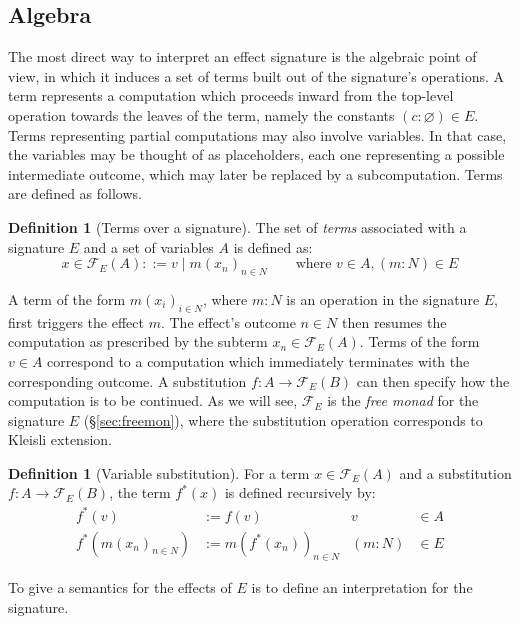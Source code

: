 \documentclass[draft,11pt]{report}
\theoremstyle{definition}
\newtheorem{definition}[theorem]{Definition}
\begin{document}

\subsection{Algebra} %

The most direct way to interpret an effect signature
is the algebraic point of view,
in which it induces a set of terms
built out of the signature's operations.
A term represents a computation which proceeds inward
from the top-level operation
towards the leaves of the term,
namely the constants $(c : \varnothing) \in E$.
Terms representing partial computations may also involve variables.
In that case,
the variables may be thought of as placeholders,
each one representing a possible intermediate outcome,
which may later be replaced by a subcomputation.
Terms are defined as follows.

\begin{definition}[Terms over a signature]
The set of \emph{terms} associated with
a signature $E$ and a set of variables $A$
is defined as:
\[
  x \in \mathcal{F}_E(A) ::= v \mid m(x_n)_{n \in N}
  \qquad
  \text{where } v \in A, (m : N) \in E
\]
\end{definition}

A term of the form $m(x_i)_{i \in N}$,
where $m : N$ is an operation in the signature $E$,
first triggers the effect $m$.
The effect's outcome $n \in N$ then resumes the computation
as prescribed by the subterm $x_n \in \mathcal{F}_E(A)$.
Terms of the form $v \in A$ correspond to a computation
which immediately terminates with the corresponding outcome.
A substitution $f : A \rightarrow \mathcal{F}_E(B)$
can then specify how the computation is to be continued.
As we will see,
$\mathcal{F}_E$ is the \emph{free monad}
for the signature $E$ (\S\ref{sec:freemon}),
where the substitution operation
corresponds to Kleisli extension.

\begin{definition}[Variable substitution]
For a term $x \in \mathcal{F}_E(A)$ and
a substitution $f : A \rightarrow \mathcal{F}_E(B)$,
the term $f^*(x)$ is defined recursively by:
\begin{align*}
  f^*(v) &:= f(v) & v &\in A \\
  f^*(m(x_n)_{n \in N}) &:= m(f^*(x_n))_{n \in N} & (m:N) &\in E
\end{align*}
\end{definition}

To give a semantics for the effects of $E$ is
to define an interpretation for the signature.
\end{document}
